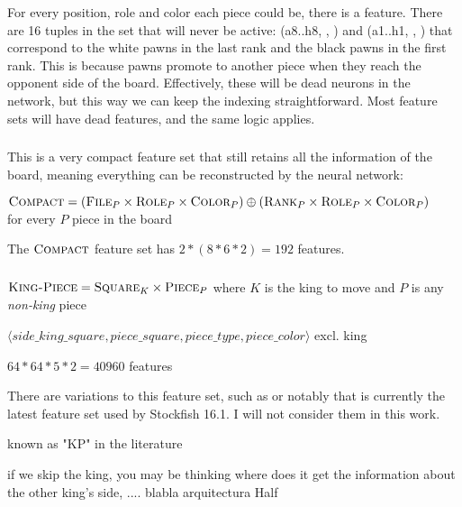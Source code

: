 For every position, role and color each piece could be, there is a feature. There are 16 tuples in the set that will never be active: (a8..h8, \sympawn, \white) and (a1..h1, \sympawn, \black) that correspond to the white pawns in the last rank and the black pawns in the first rank. This is because pawns promote to another piece when they reach the opponent side of the board. Effectively, these will be dead neurons in the network, but this way we can keep the indexing straightforward. Most feature sets will have dead features, and the same logic applies.

\subsubsection{\mdseries{}}

This is a very compact feature set that still retains all the information of the board, meaning everything can be reconstructed by the neural network:

\begin{center}
    $\textsc{Compact} = (\textsc{File}_{P} \times \textsc{Role}_{P} \times \textsc{Color}_{P}) \oplus (\textsc{Rank}_{P} \times \textsc{Role}_{P} \times \textsc{Color}_{P})$ \\
    for every $P$ piece in the board \\
\end{center}

The $\textsc{Compact}$ feature set has $2*(8*6*2)=192$ features.

\subsubsection{\mdseries{}}

$\textsc{King-Piece} = \textsc{Square}_{K} \times \textsc{Piece}_{P}$ where $K$ is the king to move and $P$ is any \textit{non-king} piece

$\langle side\_king\_square, piece\_square, piece\_type, piece\_color \rangle$ excl. king

$64*64*5*2=40960$ features

There are variations to this feature set, such as  or notably  that is currently the latest feature set used by Stockfish 16.1. I will not consider them in this work.

known as "KP" in the literature

if we skip the king, you may be thinking where does it get the information about the other king's side, .... blabla arquitectura Half

